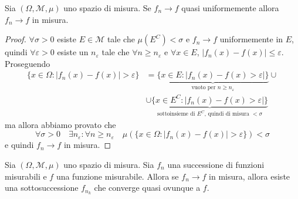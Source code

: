 \begin{theorem}\label{thm:2}
    Sia \((\Omega, \mathcal{M}, \mu)\) uno spazio di misura. Se \(f_{n} \to f\)
    quasi uniformemente allora \(f_{n} \to f\) in misura.
\end{theorem}
\begin{proof}
    \(\forall \sigma > 0\) esiste \(E \in \mathcal{M}\) tale che \(\mu{(E^{C})}
    < \sigma\) e \(f_{n} \to f\) uniformemente in \(E\), quindi 
    \(\forall  \varepsilon>0\) esiste un \(n_\varepsilon\) tale che \(\forall n
    \ge n_\varepsilon\) e \(\forall x \in E\), \(|f_{n}{(x)} - f{(x)}| \le
    \varepsilon\). Proseguendo
    \begin{align*}
        \{x \in \Omega : \left| f_{n}{(x)} - f{(x)} \right| > \varepsilon\} &=
        \underbrace{\{x \in E : \left| f_{n}{(x)} - f{(x)} > \varepsilon \right|
        \}}_{\text{vuoto per } n \ge n_\varepsilon}  \cup \\
     &\cup \underbrace{\{x \in E^{C} : \left| f_{n}{(x)} - f{(x)} >\varepsilon
        \right| \}}_{\text{sottoinsieme di \(E^{C}\), quindi di misura \(<
        \sigma\)}}  
    \end{align*}
    ma allora abbiamo provato che
    \[
        \forall \sigma > 0 \quad \exists n_\varepsilon : \forall n \ge
        n_\varepsilon \quad \mu{\left( \{x \in \Omega : \left| f_{n}{(x)} -
        f{(x)} \right| > \varepsilon \}  \right)} < \sigma
    \]
    e quindi \(f_{n} \to f\) in misura.
\end{proof}


\begin{theorem}\label{thm:3}
    Sia \((\Omega, \mathcal{M}, \mu)\) uno spazio di misura. Sia \(f_{n}\) una
    successione di funzioni misurabili e \(f\) una funzione misurabile. Allora
    se \(f_{n} \to f\) in misura, allora esiste una sottosuccessione \(f_{n_{k}}\)
    che converge quasi ovunque a \(f\).
\end{theorem}

